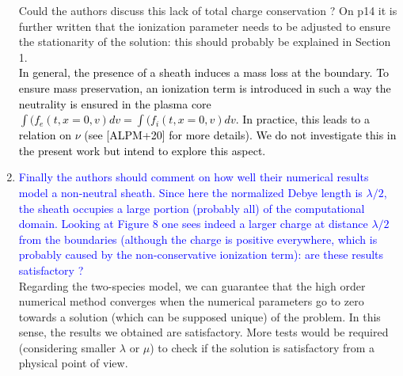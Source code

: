 \documentclass{article}
\begin{document}
\begin{enumerate}
{Could the authors discuss this lack of total charge conservation ?
On p14 it is further written that the ionization parameter needs to be adjusted to ensure the
stationarity of the solution: this should probably be explained in Section 1. }\\ 
\textcolor{black}{In general, the presence of a sheath induces a mass loss at the boundary. To ensure mass preservation, 
an ionization term is introduced in such a way the neutrality is ensured in the plasma core $\int (f_e(t, x=0, v)dv =  \int (f_i(t, x=0, v)dv$. 
In practice, this leads to a relation on $\nu$ (see [ALPM+20] for more details). We do not investigate this in the present work 
but intend to explore this aspect.  }
\item \textcolor{blue}{Finally the authors should comment on how well their numerical results model a non-neutral sheath. Since here the normalized Debye length is $\lambda/2$, the sheath
occupies a large portion (probably all) of the computational domain.
Looking at Figure 8 one sees indeed a larger charge at distance $\lambda/2$ from the boundaries (although the charge is positive everywhere, which is probably
caused by the non-conservative ionization term): are these results satisfactory ?}\\ 
Regarding the two-species model, we can guarantee that the high order numerical method converges when the numerical parameters 
go to zero towards a solution (which can be supposed unique) of the problem. In this sense, the results we obtained are satisfactory. 
More tests would be required (considering smaller $\lambda$ or $\mu$) to check if the solution is satisfactory from a physical point of view. 
\end{enumerate}
\end{document}
